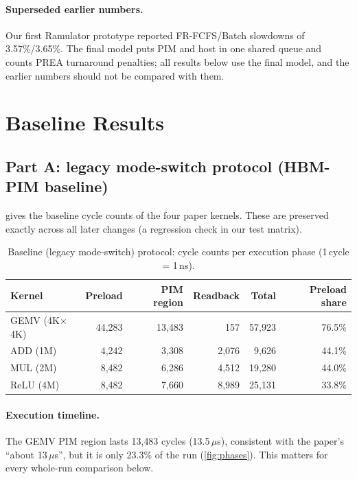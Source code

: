 \documentclass[conference]{IEEEtran}
\begin{document}
\paragraph{Superseded earlier numbers.} Our first Ramulator prototype reported FR-FCFS/Batch slowdowns of 3.57\%/3.65\%. The final model puts PIM and host in one shared queue and counts PREA turnaround penalties; all results below use the final model, and the earlier numbers should not be compared with them.

\section{Baseline Results}\label{sec:baseline}

\subsection{Part A: legacy mode-switch protocol (HBM-PIM baseline)}
 gives the baseline cycle counts of the four paper kernels. These are preserved exactly across all later changes (a regression check in our test matrix).

\begin{table}[!tbp]
\centering
\caption{Baseline (legacy mode-switch) protocol: cycle counts per execution phase (1\,cycle = 1\,ns).}\label{tab:baseline-cycles}
\scriptsize
\setlength{\tabcolsep}{3pt}
\begin{tabular}{@{}lrrrrr@{}}
\toprule
\textbf{Kernel} & \textbf{Preload} & \textbf{PIM region} & \textbf{Readback} & \textbf{Total} & \textbf{Preload share}\\
\midrule
GEMV (4K$\times$4K) & 44{,}283 & 13{,}483 & 157 & 57{,}923 & 76.5\%\\
ADD (1M)            & 4{,}242  & 3{,}308  & 2{,}076 & 9{,}626 & 44.1\%\\
MUL (2M)            & 8{,}482  & 6{,}286  & 4{,}512 & 19{,}280 & 44.0\%\\
ReLU (4M)           & 8{,}482  & 7{,}660  & 8{,}989 & 25{,}131 & 33.8\%\\
\bottomrule
\end{tabular}
\end{table}

\paragraph{Execution timeline.} The GEMV PIM region lasts 13{,}483 cycles (13.5\,$\mu$s), consistent with the paper's ``about 13\,$\mu$s'', but it is only 23.3\% of the run (\cref{fig:phases}). This matters for every whole-run comparison below.
\end{document}
